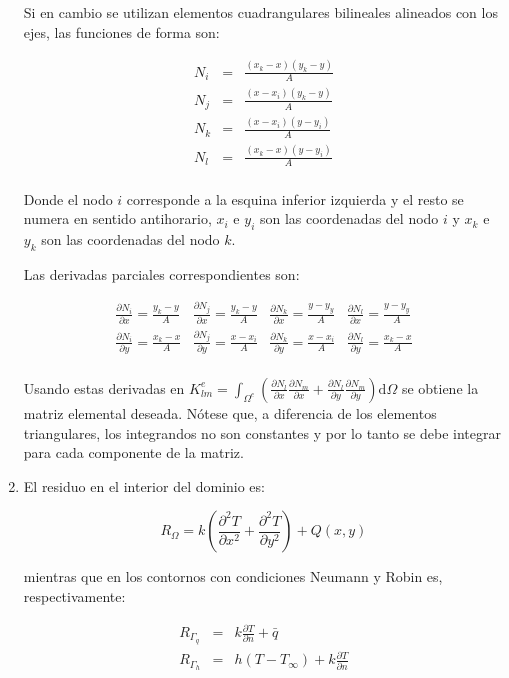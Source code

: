 \documentclass{article}
\def\domega{\mbox{d}\Omega}
\def\intomegae#1{\int_{\Omega^e} #1 \domega}
\def\partialx#1{\frac{\partial #1}{\partial x}}
\def\partialy#1{\frac{\partial #1}{\partial y}}
\def\partialn#1{\frac{\partial #1}{\partial n}}
\def\partialxx#1{\frac{\partial^2 #1}{\partial x^2}}
\def\partialyy#1{\frac{\partial^2 #1}{\partial y^2}}
\begin{document}
\begin{enumerate}[1)]
{        Si en cambio se utilizan elementos cuadrangulares bilineales alineados con los ejes,
        las funciones de forma son:

        \begin{eqnarray*}
            N_i &=& \frac{(x_k-x)(y_k-y)}{A} \\
            N_j &=& \frac{(x-x_i)(y_k-y)}{A} \\
            N_k &=& \frac{(x-x_i)(y-y_i)}{A} \\
            N_l &=& \frac{(x_k-x)(y-y_i)}{A} \\
        \end{eqnarray*}

        Donde el nodo $i$ corresponde a la esquina inferior izquierda y el resto se numera
        en sentido antihorario, $x_i$ e $y_i$ son las coordenadas del nodo $i$ y
        $x_k$ e $y_k$ son las coordenadas del nodo $k$.

        Las derivadas parciales correspondientes son:

        \[
            \begin{array}{llll}
                \partialx{N_i} = \frac{y_k-y}{A} & 
                \partialx{N_j} = \frac{y_k-y}{A} & 
                \partialx{N_k} = \frac{y-y_y}{A} & 
                \partialx{N_l} = \frac{y-y_y}{A} \\[0.25cm]
                \partialy{N_i} = \frac{x_k-x}{A} & 
                \partialy{N_j} = \frac{x-x_i}{A} & 
                \partialy{N_k} = \frac{x-x_i}{A} & 
                \partialy{N_l} = \frac{x_k-x}{A} \\
            \end{array}
        \]
        
        Usando estas derivadas en $K_{lm}^e = \intomegae{\left( \partialx{N_l}\partialx{N_m} + 
        \partialy{N_l}\partialy{N_m}\right)}$ se obtiene la matriz elemental deseada.
        Nótese que, a diferencia de los elementos triangulares, los integrandos no son
        constantes y por lo tanto se debe integrar para cada componente de la matriz.
    }
    \item{ %
        El residuo en el interior del dominio es:

        \[ R_\Omega = k\left(\partialxx{T} + \partialyy{T}\right) + Q(x, y) \]

        mientras que en los contornos con condiciones Neumann y Robin es, respectivamente:

        \begin{eqnarray*}
        R_{\Gamma_q} &=& k \partialn{T} + \bar{q} \\
        R_{\Gamma_h} &=& h\left(T-T_\infty\right) + k \partialn{T}
        \end{eqnarray*}

}
\end{enumerate}
\end{document}
